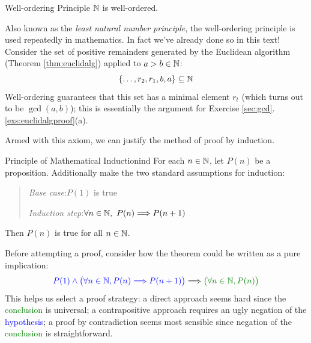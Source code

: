 \begin{axiom}{Well-ordering Principle}{}
	$\mathbb{N}$ is well-ordered.
\end{axiom}


Also known as the \emph{least natural number principle}, the well-ordering principle is used repeatedly in mathematics. In fact we've already done so in this text! Consider the set of positive remainders generated by the Euclidean algorithm (Theorem \ref{thm:euclidalg}) applied to $a>b\in\mathbb{N}$:
\[
	\{\ldots,r_2,r_1,b,a\}\subseteq\mathbb{N}
\]
Well-ordering guarantees that this set has a minimal element $r_t$ (which turns out to be $\gcd(a,b)$); this is essentially the argument for Exercise \ref*{sec:gcd}.\ref{exs:euclidalgproof}(a).

\goodbreak  

Armed with this axiom, we can justify the method of proof by induction. 

\begin{thm}{Principle of Mathematical Induction}{ind}
	For each $n\in\mathbb{N}$, let $P(n)$ be a proposition. Additionally make the two standard assumptions for induction:
	\begin{quote}
		\emph{Base case}:\lstsp $P(1)$ is true\par
		\emph{Induction step}:\lstsp $\forall n\in\N,\ P(n)\Longrightarrow P(n+1)$
	\end{quote}
	Then $P(n)$ is true for all $n\in\mathbb{N}$.
\end{thm}

Before attempting a proof, consider how the theorem could be written as a pure implication:
\[
	\textcolor{blue}{P(1)\wedge\bigl(\forall n\in\N,P(n)\Longrightarrow P(n+1)\bigr)}\Longrightarrow \textcolor{Green}{\bigl(\forall n\in\N, P(n)\bigr)}
\]
This helps us select a proof strategy: a direct approach seems hard since the \textcolor{Green}{conclusion} is universal; a contrapositive approach requires an ugly negation of the \textcolor{blue}{hypothesis}; a proof by contradiction seems most sensible since negation of the \textcolor{Green}{conclusion} is straightforward.

